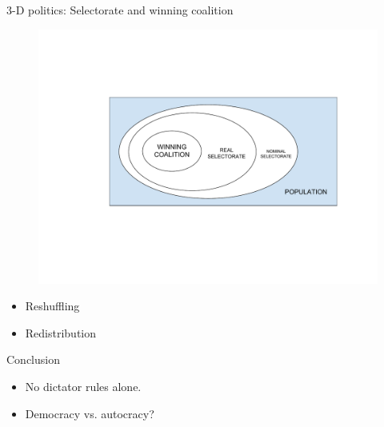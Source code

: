 \documentclass[10pt]{beamer}
\begin{document}
\begin{frame}{3-D politics: Selectorate and winning coalition}
	\begin{figure}
	\centering
	\includegraphics[scale=0.5]{Figs/selectorate}
	\end{figure}
	\pause
	\begin{itemize}
	\item Reshuffling
	\item Redistribution
	\end{itemize}
\end{frame}

\begin{frame}{Conclusion}
	\begin{itemize}
		\item No dictator rules alone.
		\item Democracy vs. autocracy?
	\end{itemize}
\end{frame}
\end{document}
